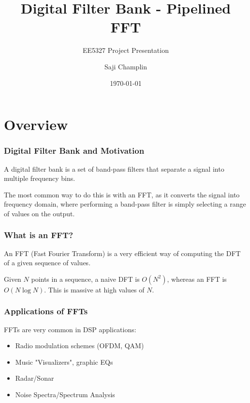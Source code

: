 \documentclass{beamer}
\title[Pipelined FFT]{Digital Filter Bank - Pipelined FFT}
\author{Saji Champlin}
\institute{University of Minnesota}
\date{\today}
\subtitle{EE5327 Project Presentation}
\begin{document}
\frame{\titlepage}

\section{Overview}

\begin{frame}
	\frametitle{Digital Filter Bank and Motivation}
	A digital filter bank is a set of band-pass filters that
	separate a signal into multiple frequency bins.

	The most common way to do this is with an FFT, as
	it converts the signal into frequency domain,
	where performing a band-pass filter is simply selecting
	a range of values on the output.
\end{frame}

\begin{frame}[fragile]
	\frametitle{What is an FFT?}

	An FFT (Fast Fourier Transform) is a very efficient way of computing
	the DFT of a given sequence of values.

	Given $N$ points in a sequence, a naive DFT is $O(N^2)$, whereas an FFT
	is $O(N \log{N})$. This is massive at high values of $N$.
	\pause
	\begin{figure}
		\centering
	\end{figure}

\end{frame}


\begin{frame}
	\frametitle{Applications of FFTs}
	FFTs are very common in DSP applications:

	\begin{itemize}
		\item Radio modulation schemes (OFDM, QAM)
		\item Music "Visualizers", graphic EQs
		\item Radar/Sonar
		\item Noise Spectra/Spectrum Analysis
	\end{itemize}
\end{frame}
\end{document}
